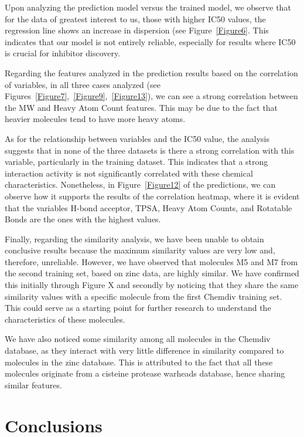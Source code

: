 \documentclass[final,times,twocolumn,article]{elsarticle}
\begin{document}
Upon analyzing the prediction model versus the trained model, we observe that for the data of greatest interest to us, those with higher IC50 values, the regression line shows an increase in dispersion (see Figure~\ref{Figure6}. This indicates that our model is not entirely reliable, especially for results where IC50 is crucial for inhibitor discovery.

Regarding the features analyzed in the prediction results based on the correlation of variables, in all three cases analyzed (see Figures~\ref{Figure7},~\ref{Figure9},~\ref{Figure13}), we can see a strong correlation between the MW and Heavy Atom Count features. This may be due to the fact that heavier molecules tend to have more heavy atoms.

As for the relationship between variables and the IC50 value, the analysis suggests that in none of the three datasets is there a strong correlation with this variable, particularly in the training dataset. This indicates that a strong interaction activity is not significantly correlated with these chemical characteristics. Nonetheless, in Figure~\ref{Figure12} of the predictions, we can observe how it supports the results of the correlation heatmap, where it is evident that the variables H-bond acceptor, TPSA, Heavy Atom Counts, and Rotatable Bonds are the ones with the highest values.

Finally, regarding the similarity analysis, we have been unable to obtain conclusive results because the maximum similarity values are very low and, therefore, unreliable. However, we have observed that molecules M5 and M7 from the second training set, based on zinc data, are highly similar. We have confirmed this initially through Figure X and secondly by noticing that they share the same similarity values with a specific molecule from the first Chemdiv training set. This could serve as a starting point for further research to understand the characteristics of these molecules.

We have also noticed some similarity among all molecules in the Chemdiv database, as they interact with very little difference in similarity compared to molecules in the zinc database. This is attributed to the fact that all these molecules originate from a cisteine protease warheads database, hence sharing similar features.

\FloatBarrier
\section{Conclusions}
\end{document}
